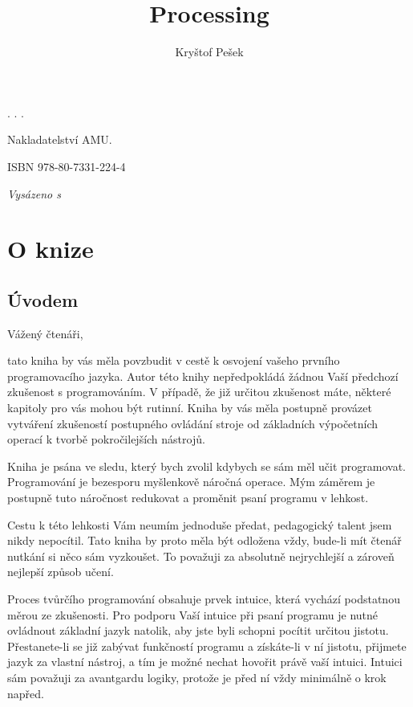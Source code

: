 \documentclass[10pt]{book}
\title{Processing}
\author{Kryštof Pešek}
\date{} %
\newcommand{\oddil}[1]{\section{#1}\index{#1}\label{#1}}
\begin{document}
.
\thispagestyle{empty}
\newpage
.
\thispagestyle{empty}
\newpage
.
\thispagestyle{empty}
\newpage

\vfill

Nakladatelství AMU.

ISBN 978-80-7331-224-4

{\em Vysázeno s \XeLaTeX}


\thispagestyle{empty}



\tableofcontents


\chapter{O knize}



\vfill
\thispagestyle{empty}



\oddil{Úvodem}




Vážený čtenáři,

tato kniha by vás měla povzbudit v cestě k osvojení vašeho prvního programovacího jazyka. Autor této knihy nepředpokládá žádnou Vaší předchozí zkušenost s programováním. V případě, že již určitou zkušenost máte, některé kapitoly pro vás mohou být rutinní. Kniha by vás měla postupně provázet vytváření zkušeností postupného ovládání stroje od základních výpočetních operací k tvorbě pokročilejších nástrojů.

Kniha je psána ve sledu, který bych zvolil kdybych se sám měl učit programovat. Programování je bezesporu myšlenkově náročná operace. Mým záměrem je postupně tuto náročnost redukovat a proměnit psaní programu v lehkost.

Cestu k této lehkosti Vám neumím jednoduše předat, pedagogický talent jsem nikdy nepocítil. Tato kniha by proto měla být odložena vždy, bude-li mít čtenář nutkání si něco sám vyzkoušet. To považuji za absolutně nejrychlejší a zároveň nejlepší způsob učení.

Proces tvůrčího programování obsahuje prvek intuice, která vychází podstatnou měrou ze zkušenosti. Pro podporu Vaší intuice při psaní programu je nutné ovládnout základní jazyk natolik, aby jste byli schopni pocítit určitou jistotu. Přestanete-li se již zabývat funkčností programu a získáte-li v ní jistotu, přijmete jazyk za vlastní nástroj, a tím je možné nechat hovořit právě vaší intuici. Intuici sám považuji za avantgardu logiky, protože je před ní vždy minimálně o krok napřed.
\end{document}
